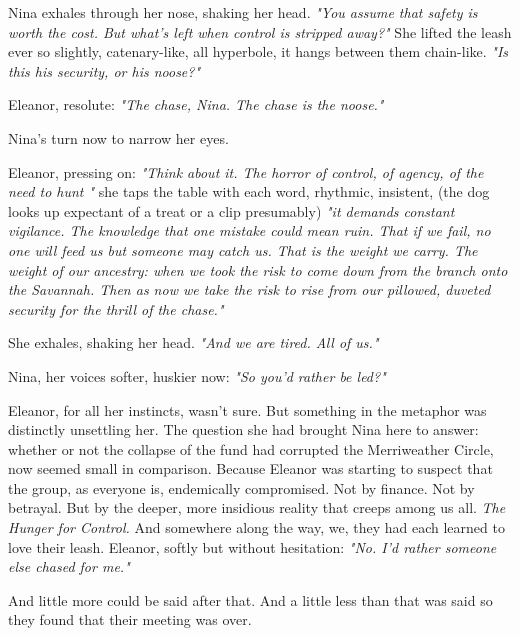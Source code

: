 Nina exhales through her nose, shaking her head. \textit{"You assume that safety is worth the cost. But what’s left when control is stripped away?"} She lifted the leash ever so slightly, catenary-like, all hyperbole, it hangs between them chain-like. \textit{"Is this his security, or his noose?"}

\smallskip

Eleanor, resolute: \textit{"The chase, Nina. The chase is the noose."}

\smallskip

Nina's turn now to narrow her eyes.  

\smallskip

Eleanor, pressing on: \textit{"Think about it. The horror of control, of agency, of the need to hunt "} she taps the table with each word, rhythmic, insistent, (the dog looks up expectant of a treat or a clip presumably) \textit{"it demands \textit{constant vigilance}. The knowledge that one mistake could mean ruin. That if we fail, no one will feed us but someone may catch us. That is the weight we carry. The weight of our ancestry: when we took the risk to come down from the branch onto the Savannah. Then as now we take the risk to rise from our pillowed, duveted security for the thrill of the chase."} 

She exhales, shaking her head. \textit{"And we are tired. All of us."}

\smallskip

Nina, her voices softer, huskier now: \textit{"So you’d rather be led?"}

\smallskip

Eleanor, for all her instincts, wasn’t sure. But something in the metaphor was distinctly unsettling her. The question she had brought Nina here to answer: whether or not the collapse of the fund had corrupted the Merriweather Circle, now seemed small in comparison. Because Eleanor was starting to suspect that the group, as everyone is, endemically compromised.
Not by finance. Not by betrayal. But by the deeper, more insidious reality that creeps among us all. \textit{The Hunger for Control.}
And somewhere along the way, we, they had each learned to love their leash. Eleanor, softly but without hesitation: \textit{"No. I'd rather someone else chased for me."}

\smallskip

And little more could be said after that. And a little less than that was said so they found that their meeting was over. 

\smallskip

